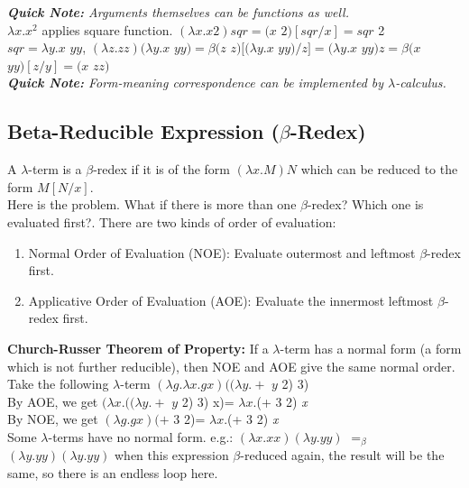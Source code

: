 \documentclass[12pt,a4paper]{article}
\begin{document}
{\textit{\textbf{Quick Note: }Arguments themselves can be functions as well.}\\

$\lambda x.x^{2}$ applies square function. $(\lambda x.x2)sqr=(x$ $2)[sqr/x]=sqr$ 2\\

\noindent $sqr=\lambda y.x$ $yy$, $(\lambda z. zz)(\lambda y. x$ $yy)=\beta (z$ $z)[(\lambda y.x$ $yy)/z]=(\lambda y.x$ $yy)z=\beta (x$ $yy)[z/y]=(x$ $zz)$\\

\textit{\textbf{Quick Note: }Form-meaning correspondence can be implemented by $\lambda$-calculus.}\\

\subsection{Beta-Reducible Expression ($\beta$-Redex)}
A $\lambda$-term is a $\beta$-redex if it is of the form $(\lambda x.M)N$ which can be reduced to the form $M[N/x]$.\\

Here is the problem. What if there is more than one $\beta$-redex? Which one is evaluated first?. There are two kinds of order of evaluation:
\begin{enumerate}
\item Normal Order of Evaluation (NOE): Evaluate outermost and leftmost $\beta$-redex first.
\item Applicative Order of Evaluation (AOE): Evaluate the innermost leftmost $\beta$-redex first.
\end{enumerate}

\textbf{Church-Russer Theorem of Property:} If a $\lambda$-term has a normal form (a form which is not further reducible), then NOE and AOE give the same normal order.\\

Take the following $\lambda$-term $(\lambda g.\lambda x. gx)((\lambda y.+$ $y$ 2) 3)\\

By AOE, we get $(\lambda x.((\lambda y.+$ $y$ 2) 3) x)= $\lambda x.$(+ 3 2) \textit{x}\\

By NOE, we get $(\lambda g.gx)(+$ 3 2)= $\lambda x.$(+ 3 2) \textit{x}\\

Some $\lambda$-terms have no normal form. e.g.: $(\lambda x.xx)(\lambda y.yy)$ $=_\beta$ $(\lambda y.yy)(\lambda y.yy)$ when this expression $\beta$-reduced again, the result will be the same, so there is an endless loop here.

}
\end{document}
